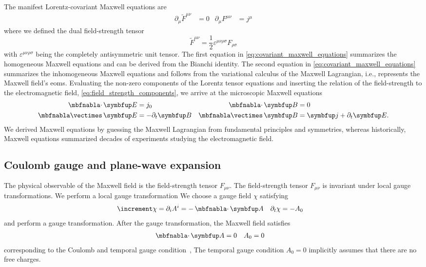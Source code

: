The manifest Lorentz-covariant Maxwell equations are~\cite[p.~336]{Srednicki2007}
\begin{align}
	\partial_\mu
	\tilde{F}^{\mu\nu}
	&=
	0
	&
	\partial_\mu
	F^{\mu\nu}
	&=
	j^\mu
	\label{eq:covariant_maxwell_equations}
\end{align}
where we defined the dual field-strength tensor~\cite[p.~142]{Greiner2013}
\begin{equation}
	\tilde{F}^{\mu\nu}
	=
	\frac{1}{2}
	\varepsilon^{\mu\nu\rho\sigma}
	F_{\rho\sigma}
	\label{eq:dual_field_strength}
\end{equation}
with $\varepsilon^{\mu\nu\rho\sigma}$ being the completely antisymmetric unit tensor.
The first equation in \cref{eq:covariant_maxwell_equations} summarizes the homogeneous Maxwell equations and can be derived from the Bianchi identity.
The second equation in \cref{eq:covariant_maxwell_equations} summarizes the inhomogeneous Maxwell equations and follows from the variational calculus of the Maxwell Lagrangian, i.e., represents the Maxwell field's \gls{eom}s.
Evaluating the non-zero components of the Lorentz tensor equations and inserting the relation of the field-strength to the electromagnetic field, \cref{eq:field_strength_components}, we arrive at the microscopic Maxwell equations
\begin{align}
	\div\vb{E}
	&=
	j_0
	&
	\div\vb{B}
	&=
	0
	\\
	\curl\vb{E}
	&=
	-\partial_t\vb{B}
	&
	\curl\vb{B}
	&=
	\vb{j}
	+
	\partial_t\vb{E}
	.
\end{align}
We derived Maxwell equations by guessing the Maxwell Lagrangian from fundamental principles and symmetries, whereas historically, Maxwell equations summarized decades of experiments studying the electromagnetic field.

\subsection{Coulomb gauge and plane-wave expansion}

The physical observable of the Maxwell field is the field-strength tensor $F_{\mu\nu}$.
The field-strength tensor $F_{\mu\nu}$ is invariant under local gauge transformations.
We perform a local gauge transformation 
We choose a gauge field $\chi$ satisfying
\begin{align}
	\laplace\chi
	&=
	\partial_i A^i
	=
	-
	\div\vb{A}
	&
	\partial_t
	\chi
	&=
	-
	A_0
\end{align}
and perform a gauge transformation.
After the gauge transformation, the Maxwell field satisfies
\begin{align}
	\div\vb{A}
	&=
	0
	&
	A_0
	&=0
\end{align}
corresponding to the Coulomb and temporal gauge condition~\cite[p.~144]{Greiner2013},
The temporal gauge condition $A_0=0$ implicitly assumes that there are no free charges.


